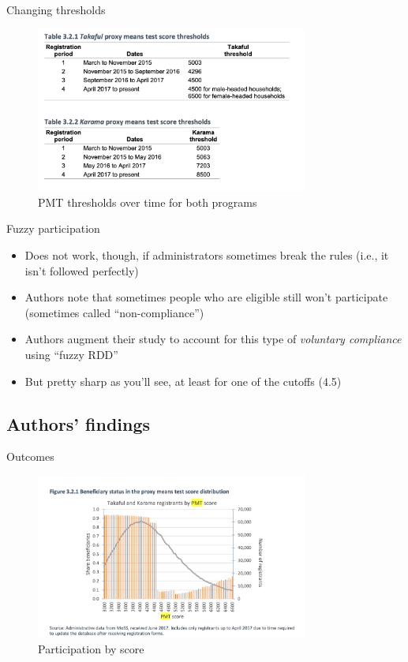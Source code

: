 \documentclass{beamer}
\begin{document}
\begin{frame}{Changing thresholds}
    \begin{figure}
        \centering
        \includegraphics[width=0.8\textwidth]{./lecture_includes/takaful_table1.png}
        \caption{PMT thresholds over time for both programs}
    \end{figure}
\end{frame}

\begin{frame}{Fuzzy participation}

\begin{itemize}
\item Does not work, though, if administrators sometimes break the rules (i.e., it isn't followed perfectly)
\item Authors note that sometimes people who are eligible still won't participate (sometimes called ``non-compliance'')
\item Authors augment their study to account for this type of \emph{voluntary compliance} using ``fuzzy RDD'' 
\item But pretty sharp as you'll see, at least for one of the cutoffs (4.5)
\end{itemize}

\end{frame}

\subsection{Authors' findings}

\begin{frame}{Outcomes}
    \begin{figure}
        \centering
        \includegraphics[width=0.8\textwidth]{./lecture_includes/takaful_density.png}
        \caption{Participation by score}
    \end{figure}
\end{frame}
\end{document}
